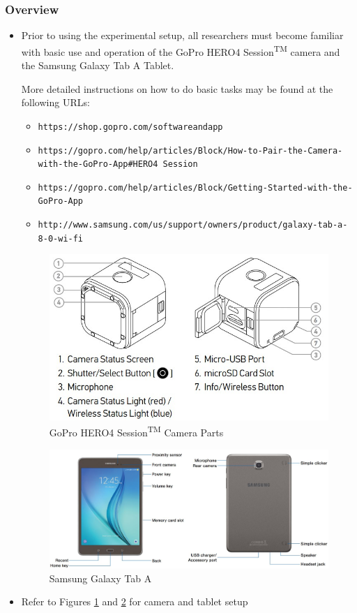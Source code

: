 \documentclass[letterpaper,11pt]{article}
\begin{document}
    \subsubsection{Overview}
    	\begin{itemize}
    	\item Prior to using the experimental setup, all researchers must become 
        familiar with basic use and operation of the 
        GoPro\textsuperscript{\textcopyright} HERO4
        Session\textsuperscript{TM} camera and the Samsung Galaxy Tab A Tablet. 
        
        More detailed instructions on how to do basic tasks may be found at the 
        following URLs:
        \begin{itemize}
        \item \texttt{https://shop.gopro.com/softwareandapp}
        \item \texttt{https://gopro.com/help/articles/Block/How-to-Pair-the-Camera-with-the-GoPro-App\#HERO4 Session}
        \item \texttt{https://gopro.com/help/articles/Block/Getting-Started-with-the-GoPro-App}
        \item \texttt{http://www.samsung.com/us/support/owners/product/galaxy-tab-a-8-0-wi-fi}
        \end{itemize}
    
    
\begin{figure}[H]
\centering
\includegraphics[width=.6\textwidth]{Camera_diagram.jpg}
\caption{GoPro\textsuperscript{\textcopyright} HERO4
        Session\textsuperscript{TM} Camera Parts}
\label{fig:cam_diag}
\end{figure}

\begin{figure}[H]
\centering
\includegraphics[width=1\textwidth]{tablet.jpg}
\caption{Samsung Galaxy Tab A}
\label{fig:tablet}
\end{figure}
    
    \item Refer to Figures \ref{fig:cam_diag} and \ref{fig:tablet} for camera 
        and tablet setup
        
     \end{itemize}
        
\end{document}
